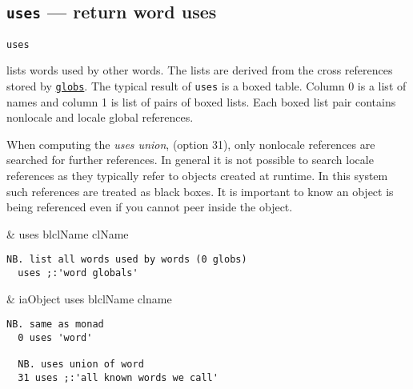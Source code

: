 \subsection{\texttt{uses} --- return word uses} 

\hypertarget{il:uses}{\texttt{uses}} lists words used by other words. The lists 
are derived from the cross references stored 
by \hyperlink{il:globs}{\texttt{globs}}. The typical result
 of \texttt{uses} is a boxed table. Column 0 is a list of names and column 1 is list 
 of pairs of boxed lists. Each boxed list pair contains nonlocale 
 and locale global references. 

When computing the \emph{uses union}, (option 31), only nonlocale references are searched for further references. In general it is not possible to search locale references as they typically refer to objects created at runtime. In this system such references are treated as black boxes. It is important to know an object is being referenced even if you cannot peer inside the object.

\begin{wordhead}
\monad & uses blclName \argsep clName \\
\end{wordhead}
\begin{lstlisting}[frame=single,framerule=0pt] 
  NB. list all words used by words (0 globs) 
  uses ;:'word globals' 
\end{lstlisting}    

\begin{wordhead}
\dyad & iaObject uses blclName \argsep clname \\
\end{wordhead}
\begin{lstlisting}[frame=single,framerule=0pt] 
  NB. same as monad
  0 uses 'word'  
  
  NB. uses union of word 
  31 uses ;:'all known words we call'   
\end{lstlisting}  
